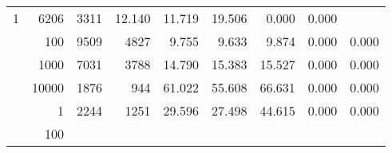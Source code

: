 \begin{table}
\begin{tabular}{rrrrrrrrr}
					
					 
					\multirow{ 1 }{*}{ 1 } &
					
						
							    
							     6206  & 3311  
	                           & 12.140 & 11.719 & 19.506
	                           & 0.000 & 0.000  \\
	                
	            
					 &  
					 
					\multirow{ 1 }{*}{ 100 } &
					
						
							    
							     9509  & 4827  
	                           & 9.755 & 9.633 & 9.874
	                           & 0.000 & 0.000  \\
	                
	            
					 &  
					 
					\multirow{ 1 }{*}{ 1000 } &
					
						
							    
							     7031  & 3788  
	                           & 14.790 & 15.383 & 15.527
	                           & 0.000 & 0.000  \\
	                
	            
					 &  
					 
					\multirow{ 1 }{*}{ 10000 } &
					
						
							    
							     1876  & 944  
	                           & 61.022 & 55.608 & 66.631
	                           & 0.000 & 0.000  \\
	                
	            
	        
				\noalign{\smallskip}\hline
				\multirow{ 4 }{*}{ 2000000 } &
				
					
					 
					\multirow{ 1 }{*}{ 1 } &
					
						
							    
							     2244  & 1251  
	                           & 29.596 & 27.498 & 44.615
	                           & 0.000 & 0.000  \\
	                
	            
					 &  
					 
					\multirow{ 1 }{*}{ 100 } &
					
						
							    

\end{tabular}
\end{table}
